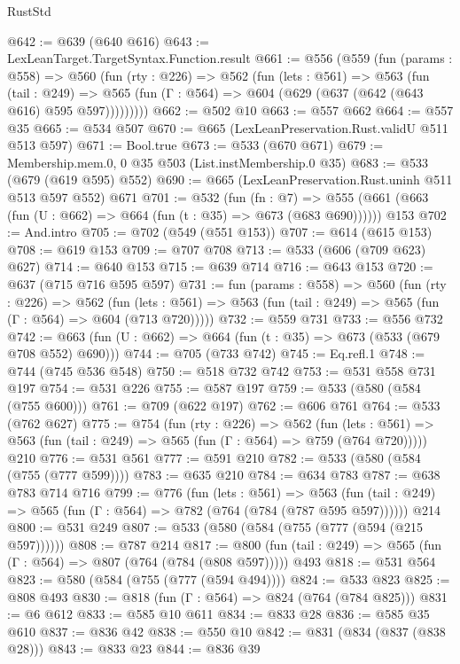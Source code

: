 \begin{lexlean}{RustStd}
\begin{coremodule}
@642 := @639 (@640 @616)
@643 := LexLeanTarget.TargetSyntax.Function.result
@661 := @556
    (@559
      (fun (params : @558) =>
      @560
        (fun (rty : @226) =>
        @562
          (fun (lets : @561) =>
          @563
            (fun (tail : @249) =>
            @565 (fun (Γ : @564) => @604 (@629 (@637 (@642 (@643 @616) @595 @597)))))))))
@662 := @502 @10
@663 := @557 @662
@664 := @557 @35
@665 := @534 @507
@670 := @665 (LexLeanPreservation.Rust.validU @511 @513 @597)
@671 := Bool.true
@673 := @533 (@670 @671)
@679 := Membership.mem.{0, 0} @35 @503 (List.instMembership.{0} @35)
@683 := @533 (@679 (@619 @595) @552)
@690 := @665 (LexLeanPreservation.Rust.uninh @511 @513 @597 @552) @671
@701 := @532
    (fun (fn : @7) =>
    @555 (@661 (@663 (fun (U : @662) => @664 (fun (t : @35) => @673 (@683 @690))))))
    @153
@702 := And.intro
@705 := @702 (@549 (@551 @153))
@707 := @614 (@615 @153)
@708 := @619 @153
@709 := @707 @708
@713 := @533 (@606 (@709 @623) @627)
@714 := @640 @153
@715 := @639 @714
@716 := @643 @153
@720 := @637 (@715 @716 @595 @597)
@731 := fun (params : @558) =>
  @560
    (fun (rty : @226) =>
    @562
      (fun (lets : @561) => @563 (fun (tail : @249) => @565 (fun (Γ : @564) => @604 (@713 @720)))))
@732 := @559 @731
@733 := @556 @732
@742 := @663 (fun (U : @662) => @664 (fun (t : @35) => @673 (@533 (@679 @708 @552) @690)))
@744 := @705 (@733 @742)
@745 := Eq.refl.{1}
@748 := @744 (@745 @536 @548)
@750 := @518 @732 @742
@753 := @531 @558 @731 @197
@754 := @531 @226
@755 := @587 @197
@759 := @533 (@580 (@584 (@755 @600)))
@761 := @709 (@622 @197)
@762 := @606 @761
@764 := @533 (@762 @627)
@775 := @754
    (fun (rty : @226) =>
    @562
      (fun (lets : @561) => @563 (fun (tail : @249) => @565 (fun (Γ : @564) => @759 (@764 @720)))))
    @210
@776 := @531 @561
@777 := @591 @210
@782 := @533 (@580 (@584 (@755 (@777 @599))))
@783 := @635 @210
@784 := @634 @783
@787 := @638 @783 @714 @716
@799 := @776
    (fun (lets : @561) =>
    @563 (fun (tail : @249) => @565 (fun (Γ : @564) => @782 (@764 (@784 (@787 @595 @597))))))
    @214
@800 := @531 @249
@807 := @533 (@580 (@584 (@755 (@777 (@594 (@215 @597))))))
@808 := @787 @214
@817 := @800 (fun (tail : @249) => @565 (fun (Γ : @564) => @807 (@764 (@784 (@808 @597))))) @493
@818 := @531 @564
@823 := @580 (@584 (@755 (@777 (@594 @494))))
@824 := @533 @823
@825 := @808 @493
@830 := @818 (fun (Γ : @564) => @824 (@764 (@784 @825)))
@831 := @6 @612
@833 := @585 @10 @611
@834 := @833 @28
@836 := @585 @35 @610
@837 := @836 @42
@838 := @550 @10
@842 := @831 (@834 (@837 (@838 @28)))
@843 := @833 @23
@844 := @836 @39

\end{coremodule}
\end{lexlean}
